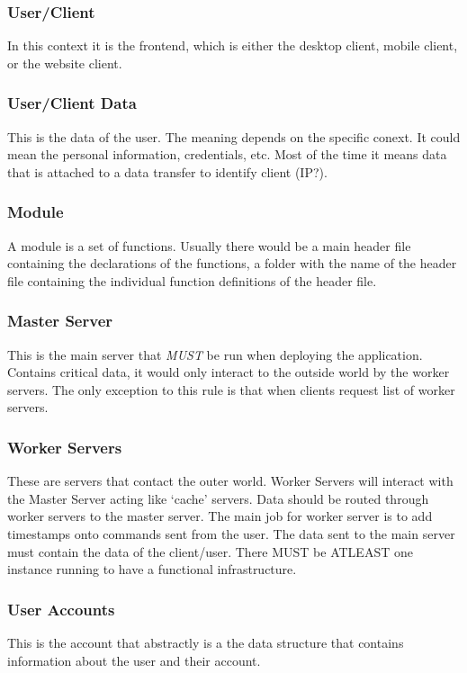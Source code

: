\documentclass[a4paper]{article}
\begin{document}
\subsubsection{User/Client}
\label{term_user}
In this context it is the frontend, which is either the desktop client,
mobile client, or the website client.

\subsubsection{User/Client Data}
\label{term_user_data}
This is the data of the user. The meaning depends on the specific conext. It
could mean the personal information, credentials, etc. Most of the time it
means data that is attached to a data transfer to identify client (IP?).

\subsubsection{Module}
\label{term_module}
A module is a set of functions. Usually there would be a main header file
containing the declarations of the functions, a folder with the name of the
header file containing the individual function definitions of the header file.

\subsubsection{Master Server}
\label{term_master}
This is the main server that \emph{MUST} be run when deploying the application.
Contains critical data, it would only interact to the outside world by the
worker servers. The only exception to this rule is that when clients request
list of worker servers.

\subsubsection{Worker Servers}
\label{term_worker}
These are servers that contact the outer world. Worker Servers will
interact with the Master Server acting like `cache' servers. Data should be 
routed through worker servers to the master server. The main job for worker 
server is to add timestamps onto commands sent from the user. The data sent to
the main server must contain the data of the client/user. There MUST be ATLEAST
one instance running to have a functional infrastructure.

\subsubsection{User Accounts}
\label{term_user_acc}
This is the account that abstractly is a the data structure that contains
information about the user and their account.
\end{document}
